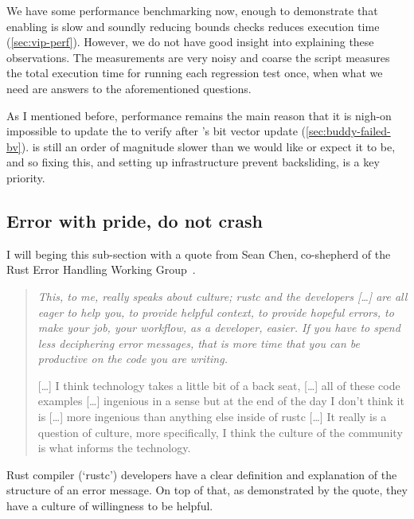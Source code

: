We have some performance benchmarking now, enough to demonstrate that enabling
 is slow and soundly reducing bounds checks reduces execution time (\cref{sec:vip-perf}). However, we
do not have good insight into explaining these observations. The measurements
are very noisy and coarse \textemdash{} the script measures the total execution
time for running each regression test once, when what we need are answers to
the aforementioned questions.

As I mentioned before, performance remains the main reason that it is nigh-on
impossible to update the  to verify after 's
bit vector update (\cref{sec:buddy-failed-bv}).  is still an order of
magnitude slower than we would like or expect it to be, and so fixing this, and
setting up infrastructure prevent backsliding, is a key priority.

\subsection{Error with pride, do not crash}\label{sec:error-msgs}

I will beging this sub-section with a quote from Sean Chen, co-shepherd
of the Rust Error Handling Working Group~.

\begin{quote}
\em
This, to me, really speaks about culture; rustc and the developers [\ldots]
are all eager to help you, to provide helpful context,
to provide hopeful errors, to make your job, your workflow, as a developer,
easier. If you have to spend less deciphering error messages, that is more time
that you can be productive on the code you are writing.

[\ldots] I think technology takes a little bit of a back seat, [\ldots] all of
these code examples [\ldots] ingenious in a sense but at the end
of the day I don't think it is [\ldots] more ingenious than anything else
inside of rustc [\ldots] It really is a question of culture, more specifically,
I think the culture of the community is what informs the technology.
\end{quote}

Rust compiler (`rustc') developers have a clear definition and explanation of
the structure of an error
message.
On top of that, as demonstrated by the quote, they have a culture of
willingness to be helpful.

